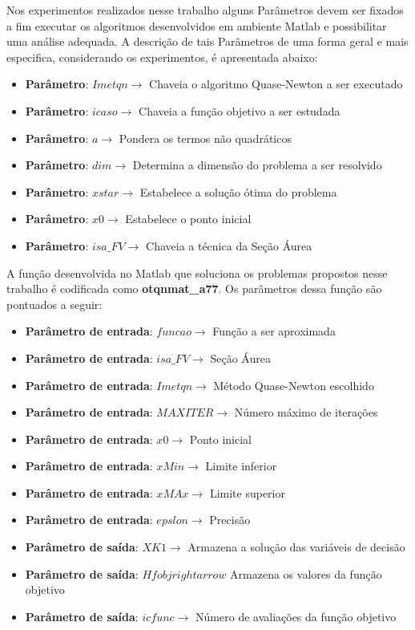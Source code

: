 Nos experimentos realizados nesse trabalho alguns Parâmetros devem ser fixados a fim executar os algoritmos desenvolvidos em ambiente Matlab e possibilitar uma análise adequada. A descrição de tais Parâmetros de uma forma geral e mais especifica, considerando os experimentos, é apresentada abaixo:
\begin{itemize}
  \item \textbf{Parâmetro}: $Imetqn\rightarrow$ Chaveia o algoritmo Quase-Newton a ser executado
  \item \textbf{Parâmetro}: $icaso\rightarrow$ Chaveia a função objetivo a ser estudada
  \item \textbf{Parâmetro}: $a\rightarrow$ Pondera os termos não quadráticos
  \item \textbf{Parâmetro}: $dim\rightarrow$ Determina a dimensão do problema a ser resolvido
  \item \textbf{Parâmetro}: $xstar\rightarrow$ Estabelece a solução ótima do problema
  \item \textbf{Parâmetro}: $x0\rightarrow$ Estabelece o ponto inicial
  \item \textbf{Parâmetro}: $isa\_FV\rightarrow$ Chaveia a técnica da Seção Áurea
\end{itemize}

A função desenvolvida no Matlab que soluciona os problemas propostos nesse trabalho é codificada como \textbf{otqnmat\_a77}. Os parâmetros dessa função são pontuados a seguir:

\begin{itemize}
  \item \textbf{Parâmetro de entrada}: $funcao\rightarrow$ Função a ser aproximada
  \item \textbf{Parâmetro de entrada}: $isa\_FV\rightarrow$ Seção Áurea
  \item \textbf{Parâmetro de entrada}: $Imetqn\rightarrow$ Método Quase-Newton escolhido 
  \item \textbf{Parâmetro de entrada}: $MAXITER\rightarrow$ Número máximo de iterações 
  \item \textbf{Parâmetro de entrada}: $x0\rightarrow$ Ponto inicial
  \item \textbf{Parâmetro de entrada}: $xMin\rightarrow$ Limite inferior 
  \item \textbf{Parâmetro de entrada}: $xMAx\rightarrow$ Limite superior 
  \item \textbf{Parâmetro de entrada}: $epslon\rightarrow$ Precisão
  \item \textbf{Parâmetro de saída}: $XK1\rightarrow$ Armazena a solução das variáveis de decisão 
  \item \textbf{Parâmetro de saída}: $Hfobjrightarrow$ Armazena os valores da função objetivo 
  \item \textbf{Parâmetro de saída}: $icfunc\rightarrow$ Número de avaliações da função objetivo
\end{itemize}

